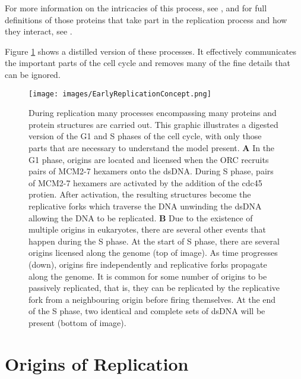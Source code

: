 		For more information on the intricacies of this process, see \cite{OriginsReview}, and for full definitions of those proteins that take part in the replication process and how they interact, see \cite{PurifiedProteins}.
		
	Figure \ref{EarlyReplicationConcept} shows a distilled version of these processes. It effectively communicates the important parts of the cell cycle and removes many of the fine details that can be ignored.
	
	\begin{figure}[tbh]
		\begin{center}
			\texttt{[image: images/EarlyReplicationConcept.png]}
		\end{center}
			\caption[Events During Replication]{\label{EarlyReplicationConcept} During replication many processes encompassing many proteins and protein structures are carried out.
				This graphic illustrates a digested version of the G1 and S phases of the cell cycle, with only those parts that are necessary to understand the model present.
				\textbf{A} In the G1 phase, origins are located and licensed when the ORC recruits pairs of MCM2-7 hexamers onto the dsDNA.
					During S phase, pairs of MCM2-7 hexamers are activated by the addition of the cdc45 protien.
					After activation, the resulting structures become the replicative forks which traverse the DNA unwinding the dsDNA allowing the DNA to be replicated.
				\textbf{B} Due to the existence of multiple origins in eukaryotes, there are several other events that happen during the S phase.
					At the start of S phase, there are several origins licensed along the genome (top of image).
					As time progresses (down), origins fire independently and replicative forks propagate along the genome.
					It is common for some number of origins to be passively replicated, that is, they can be replicated by the replicative fork from a neighbouring origin before firing themselves.
					At the end of the S phase, two identical and complete sets of dsDNA will be present (bottom of image).}
	\end{figure}
	
	
	\section{Origins of Replication}
	

